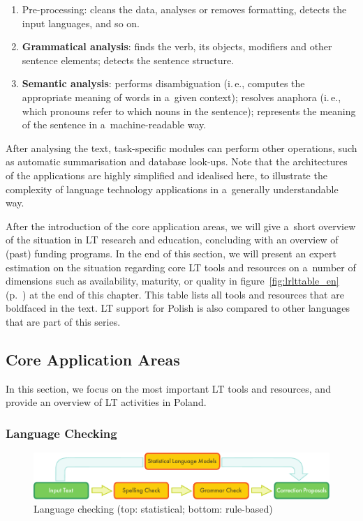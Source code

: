 \begin{multicols}{2}
\begin{enumerate} \item Pre-processing: cleans the data, analyses or
removes formatting, detects the input languages, and so on. \item
\textbf{Grammatical analysis}: finds the verb, its objects, modifiers and other sentence elements; detects the sentence structure. \item
\textbf{Semantic analysis}: performs disambiguation (i.\,e., computes
the appropriate meaning of words in a~given context); resolves
anaphora (i.\,e., which pronouns refer to which nouns in the
sentence); represents the meaning of the sentence in
a~machine-readable way. \end{enumerate} 

After analysing the text, task-specific modules can perform other
operations, such as automatic summarisation and database look-ups.
Note that the architectures of the applications are highly simplified
and idealised here, to illustrate the complexity of language
technology applications in a~generally understandable way. 

After the introduction of the core application areas, we will give
a~short overview of the situation in LT research and education,
concluding with an overview of (past) funding programs. In the end of
this section, we will present an expert estimation on the situation
regarding core LT tools and resources on a~number of dimensions such
as availability, maturity, or quality in figure~\ref{fig:lrlttable_en} (p.~\pageref{fig:lrlttable_en}) at the end of this
chapter. This table lists all tools and resources that are boldfaced
in the text. LT support for Polish is also compared to other languages
that are part of this series. 

\subsection{Core Application Areas} 

In this section, we focus on the most important LT tools and
resources, and provide an overview of LT activities in Poland. 

\subsubsection{Language Checking} 

\begin{figure}[t]  \center
\includegraphics[width=\textwidth]{../_media/english/language_checking}
\caption{Language checking (top: statistical; bottom: rule-based)}
\label{fig:langcheckingaarch_en} 
\end{figure} 


\end{multicols}
